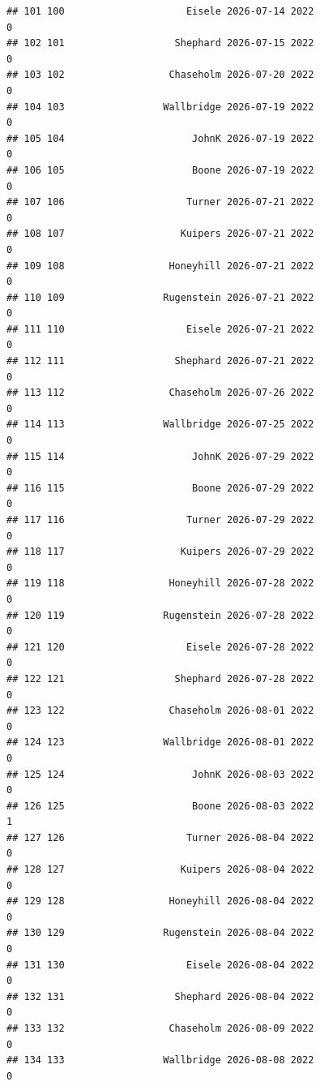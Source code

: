 \documentclass[
]{article}
\begin{document}
\begin{verbatim}
## 101 100                     Eisele 2026-07-14 2022                       0
## 102 101                   Shephard 2026-07-15 2022                       0
## 103 102                  Chaseholm 2026-07-20 2022                       0
## 104 103                 Wallbridge 2026-07-19 2022                       0
## 105 104                      JohnK 2026-07-19 2022                       0
## 106 105                      Boone 2026-07-19 2022                       0
## 107 106                     Turner 2026-07-21 2022                       0
## 108 107                    Kuipers 2026-07-21 2022                       0
## 109 108                  Honeyhill 2026-07-21 2022                       0
## 110 109                 Rugenstein 2026-07-21 2022                       0
## 111 110                     Eisele 2026-07-21 2022                       0
## 112 111                   Shephard 2026-07-21 2022                       0
## 113 112                  Chaseholm 2026-07-26 2022                       0
## 114 113                 Wallbridge 2026-07-25 2022                       0
## 115 114                      JohnK 2026-07-29 2022                       0
## 116 115                      Boone 2026-07-29 2022                       0
## 117 116                     Turner 2026-07-29 2022                       0
## 118 117                    Kuipers 2026-07-29 2022                       0
## 119 118                  Honeyhill 2026-07-28 2022                       0
## 120 119                 Rugenstein 2026-07-28 2022                       0
## 121 120                     Eisele 2026-07-28 2022                       0
## 122 121                   Shephard 2026-07-28 2022                       0
## 123 122                  Chaseholm 2026-08-01 2022                       0
## 124 123                 Wallbridge 2026-08-01 2022                       0
## 125 124                      JohnK 2026-08-03 2022                       0
## 126 125                      Boone 2026-08-03 2022                       1
## 127 126                     Turner 2026-08-04 2022                       0
## 128 127                    Kuipers 2026-08-04 2022                       0
## 129 128                  Honeyhill 2026-08-04 2022                       0
## 130 129                 Rugenstein 2026-08-04 2022                       0
## 131 130                     Eisele 2026-08-04 2022                       0
## 132 131                   Shephard 2026-08-04 2022                       0
## 133 132                  Chaseholm 2026-08-09 2022                       0
## 134 133                 Wallbridge 2026-08-08 2022                       0

\end{verbatim}
\end{document}
